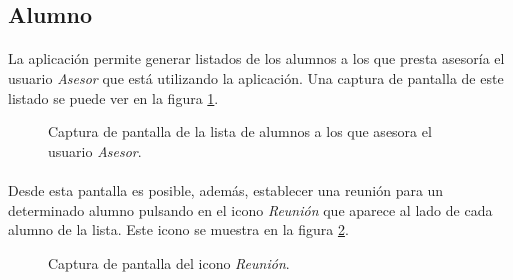 \subsection{Alumno}

  \paragraph{}La aplicación permite generar listados de los alumnos a los que
  presta asesoría el usuario \textit{Asesor} que está utilizando la aplicación.
  Una captura de pantalla de este listado se puede ver en la figura
  \ref{capturaPantallaListaAlumnosDeAsesor}.

  \begin{figure}[!ht]
    \begin{center}
      \caption{Captura de pantalla de la lista de alumnos a los que asesora el usuario \textit{Asesor}.}
      \label{capturaPantallaListaAlumnosDeAsesor}
    \end{center}
  \end{figure}

  \paragraph{}Desde esta pantalla es posible, además, establecer una reunión
  para un determinado alumno pulsando en el icono \textit{Reunión} que aparece
  al lado de cada alumno de la lista. Este icono se muestra en la figura
  \ref{capturaIconoReunion}.

  \begin{figure}[!ht]
    \begin{center}
      \caption{Captura de pantalla del icono \textit{Reunión}.}
      \label{capturaIconoReunion}
    \end{center}
  \end{figure}
